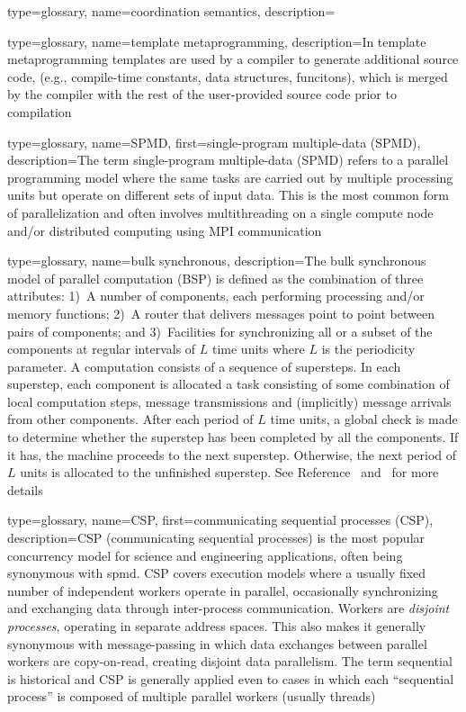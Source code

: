 {
  type=glossary,
  name={coordination semantics},
  description={}
}


{
  type=glossary,
  name={template metaprogramming},
  description={In template metaprogramming templates are used by a compiler to
    generate additional source code, (e.g., compile-time constants, data
        structures, funcitons), which is merged by the compiler with the rest
      of the user-provided source code prior to compilation} 
}

{
  type=glossary,
  name={SPMD},
  first={single-program multiple-data (SPMD)},
  description={The term single-program multiple-data (SPMD) refers to a parallel \gls{programming model} where the same tasks are carried out by multiple processing units but operate on different sets of input data. This is the most common form of parallelization and often involves multithreading on a single compute node and/or distributed computing using \gls{MPI} communication}
}




{
  type=glossary,
  name={bulk synchronous},
  description={The bulk synchronous model of parallel computation (BSP) is
  defined as the combination of three attributes: 1)~A number of
  components, each performing processing and/or memory functions; 2)~A
  router that delivers messages point to point between pairs of
  components; and 3)~Facilities for synchronizing all or a subset of
  the components at regular intervals of $L$ time units where $L$ is
  the periodicity parameter.  A computation consists of a sequence of
  supersteps. In each superstep, each component is allocated a task
  consisting of some combination of local computation steps, message
  transmissions and (implicitly) message arrivals from other
  components. After each period of $L$ time units, a global check is
  made to determine whether the superstep has been completed by all
  the components. If it has, the machine proceeds to the next
  superstep. Otherwise, the next period of $L$ units is allocated to
  the unfinished superstep.  See Reference~\cite{BSP}
  and~\cite{wikiBSP} for more details} 
}

{
  type=glossary,
  name={CSP},
  first={communicating sequential processes (CSP)},
  description={CSP (communicating sequential processes) is the most popular
    concurrency model for science and engineering applications, often being
      synonymous with \gls{spmd}. CSP covers execution models where a usually fixed number of independent workers operate in parallel,
      occasionally synchronizing and exchanging data through inter-process communication. Workers are \emph{disjoint processes},
      operating in separate address spaces.  This also makes it generally synonymous with message-passing in which data exchanges between parallel workers are copy-on-read, creating disjoint data parallelism.  The term sequential is historical and CSP is generally applied even to cases in which each ``sequential process'' is composed of multiple parallel workers (usually threads)}
}

